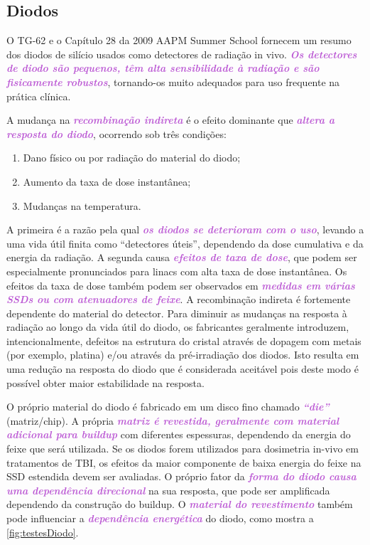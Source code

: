 \documentclass[11pt,a4paper]{article}
\newcounter{exemplo}
\begin{document}
\subsection*{Diodos}

	O TG-62 e o Capítulo 28 da 2009 AAPM Summer School fornecem um resumo dos diodos de silício usados como detectores de radiação in vivo. \textcolor{MediumOrchid}{\textbf{\textit{Os detectores de diodo são pequenos, têm alta sensibilidade à radiação e são fisicamente robustos}}}, tornando-os muito adequados para uso frequente na prática clínica.

	A mudança na \textcolor{MediumOrchid}{\textbf{\textit{recombinação indireta}}} é o efeito dominante que \textcolor{MediumOrchid}{\textbf{\textit{altera a resposta do diodo}}}, ocorrendo sob três condições:

	\begin{enumerate}[label=\textcolor{CarnationPink}{\arabic*${}^\circ $}]
		\item Dano físico ou por radiação do material do diodo;
		\item Aumento da taxa de dose instantânea;
		\item Mudanças na temperatura.
	\end{enumerate}

	A primeira é a razão pela qual \textcolor{MediumOrchid}{\textbf{\textit{os diodos se deterioram com o uso}}}, levando a uma vida útil finita como ``detectores úteis'', dependendo da dose cumulativa e da energia da radiação. A segunda causa \textcolor{MediumOrchid}{\textbf{\textit{efeitos de taxa de dose}}}, que podem ser especialmente pronunciados para linacs com alta taxa de dose instantânea. Os efeitos da taxa de dose também podem ser observados em\textcolor{MediumOrchid}{\textbf{\textit{ medidas em várias SSDs ou com atenuadores de feixe}}}. A recombinação indireta é fortemente dependente do material do detector. Para diminuir as mudanças na resposta à radiação ao longo da vida útil do diodo, os fabricantes geralmente introduzem, intencionalmente, defeitos na estrutura do cristal através de dopagem com metais (por exemplo, platina) e/ou através da pré-irradiação dos diodos. Isto resulta em uma redução na resposta do diodo que é considerada aceitável pois deste modo é possível obter maior estabilidade na resposta.

	O próprio material do diodo é fabricado em um disco fino chamado \textcolor{MediumOrchid}{\textbf{\textit{``die''}}} (matriz/chip). A própria \textcolor{MediumOrchid}{\textbf{\textit{matriz é revestida, geralmente com material adicional para buildup}}} com diferentes espessuras, dependendo da energia do feixe que será utilizada. Se os diodos forem utilizados para dosimetria in-vivo em tratamentos de TBI, os efeitos da maior componente de baixa energia do feixe na SSD estendida devem ser avaliadas. O próprio fator da \textcolor{MediumOrchid}{\textbf{\textit{forma do diodo causa uma dependência direcional}}} na sua resposta, que pode ser amplificada dependendo da construção do buildup. O \textcolor{MediumOrchid}{\textbf{\textit{material do revestimento}}} também pode influenciar a \textcolor{MediumOrchid}{\textbf{\textit{dependência energética}}} do diodo, como mostra a \ref{fig:testesDiodo}.
\end{document}
